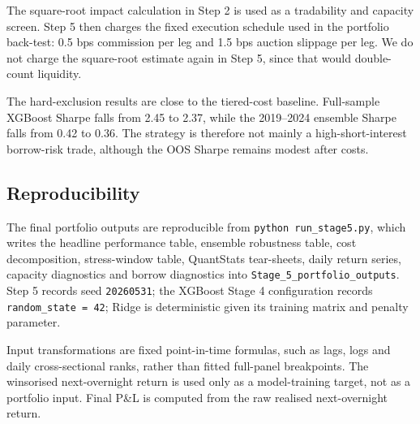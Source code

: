\documentclass[12pt]{article}
\begin{document}
The square-root impact calculation in Step 2 is used as a tradability and capacity screen. Step 5 then charges the fixed execution schedule used in the portfolio back-test: 0.5 bps commission per leg and 1.5 bps auction slippage per leg. We do not charge the square-root estimate again in Step 5, since that would double-count liquidity.

\begin{table}[!htbp]
\centering
\scriptsize
{}
\caption{Borrow-risk diagnostics at 250M AUM. High-SI bps are cumulative gross short-book P\&L contribution, in basis points of AUM, from short positions with reported short interest above 10\% of float.}
\label{tab:audit_borrow}
\end{table}

The hard-exclusion results are close to the tiered-cost baseline. Full-sample XGBoost Sharpe falls from 2.45 to 2.37, while the 2019--2024 ensemble Sharpe falls from 0.42 to 0.36. The strategy is therefore not mainly a high-short-interest borrow-risk trade, although the OOS Sharpe remains modest after costs.

\FloatBarrier

\subsection{Reproducibility}

The final portfolio outputs are reproducible from \verb|python run_stage5.py|, which writes the headline performance table, ensemble robustness table, cost decomposition, stress-window table, QuantStats tear-sheets, daily return series, capacity diagnostics and borrow diagnostics into \verb|Stage_5_portfolio_outputs|. Step 5 records seed \texttt{20260531}; the XGBoost Stage 4 configuration records \texttt{random\_state = 42}; Ridge is deterministic given its training matrix and penalty parameter.

Input transformations are fixed point-in-time formulas, such as lags, logs and daily cross-sectional ranks, rather than fitted full-panel breakpoints. The winsorised next-overnight return is used only as a model-training target, not as a portfolio input. Final P\&L is computed from the raw realised next-overnight return.
\end{document}
